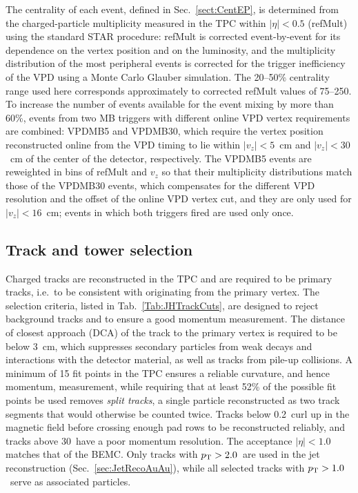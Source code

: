 The centrality of each event, defined in Sec.~\ref{sect:CentEP}, is determined from the charged-particle multiplicity measured in the TPC within $|\eta| < 0.5$ (refMult) using the standard STAR procedure: refMult is corrected event-by-event for its dependence on the vertex position and on the luminosity, and the multiplicity distribution of the most peripheral events is corrected for the trigger inefficiency of the VPD using a Monte Carlo Glauber simulation.
%
The 20--50\% centrality range used here corresponds approximately to corrected refMult values of 75--250.
%
To increase the number of events available for the event mixing by more than 60\%, events from two MB triggers with different online VPD vertex requirements are combined: VPDMB5 and VPDMB30, which require the vertex position reconstructed online from the VPD timing to lie within \(|v_{z}| < 5\)~cm and \(|v_{z}| < 30\)~cm of the center of the detector, respectively.
%
The VPDMB5 events are reweighted in bins of refMult and $v_z$ so that their multiplicity distributions match those of the VPDMB30 events, which compensates for the different VPD resolution and the offset of the online VPD vertex cut, and they are only used for $|v_z| < 16$~cm; events in which both triggers fired are used only once.

\subsection{Track and tower selection} \label{sec:TrackTowerSel}
Charged tracks are reconstructed in the TPC and are required to be primary tracks, i.e.\ to be consistent with originating from the primary vertex.
%
The selection criteria, listed in Tab.~\ref{Tab:JHTrackCuts}, are designed to reject background tracks and to ensure a good momentum measurement.
%
The distance of closest approach (DCA) of the track to the primary vertex is required to be below 3~cm, which suppresses secondary particles from weak decays and interactions with the detector material, as well as tracks from pile-up collisions.
%
A minimum of 15 fit points in the TPC ensures a reliable curvature, and hence momentum, measurement, while requiring that at least 52\% of the possible fit points be used removes \emph{split tracks}, a single particle reconstructed as two track segments that would otherwise be counted twice.
%
Tracks below 0.2~\GeVc curl up in the magnetic field before crossing enough pad rows to be reconstructed reliably, and tracks above 30~\GeVc have a poor momentum resolution.
%
The acceptance $|\eta| < 1.0$ matches that of the BEMC.
%
Only tracks with $\ensuremath{p_{\rm T}}\xspace > 2.0$~\GeVc are used in the jet reconstruction (Sec.~\ref{sec:JetRecoAuAu}), while all selected tracks with $\ensuremath{p_{\rm T}}\xspace > 1.0$~\GeVc serve as associated particles.

